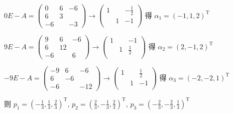 \begin{enumerate}
                   \( 0E-A = \begin{pmatrix}
                       0  & 6 & -6 \\
                       6  & 3 &    \\
                       -6 &   & -3
                   \end{pmatrix} \rightarrow \begin{pmatrix}
                       1 &   & -\frac{1}{2} \\
                         & 1 & -1           \\
                         &   &
                   \end{pmatrix} \) 得 \( \alpha_{1} = (-1, 1, 2)^{\mathrm{T}} \)

                   \( 9E-A = \begin{pmatrix}
                       9  & 6  & -6 \\
                       6  & 12 &    \\
                       -6 &    & 6
                   \end{pmatrix} \rightarrow \begin{pmatrix}
                       1 &   & -1          \\
                         & 1 & \frac{1}{2} \\
                         &   &
                   \end{pmatrix} \) 得 \( \alpha_{2} = (2, -1, 2)^{\mathrm{T}} \)

                   \( -9E-A = \begin{pmatrix}
                       -9 & 6  & -6  \\
                       6  & -6 &     \\
                       -6 &    & -12
                   \end{pmatrix} \rightarrow \begin{pmatrix}
                       1 &   & \frac{1}{2} \\
                         & 1 & -1          \\
                         &   &
                   \end{pmatrix} \) 得 \( \alpha_{3} = (-2, -2, 1)^{\mathrm{T}} \)

                   则 \( p_{1} = \left( -\frac{1}{3}, \frac{1}{3}, \frac{2}{3} \right)^{\mathrm{T}} \), \(p_{2} = \left( \frac{2}{3}, -\frac{1}{3}, \frac{2}{3} \right)^{\mathrm{T}} \), \( p_{3} = \left( -\frac{2}{3}, -\frac{2}{3}, \frac{1}{3} \right)^{\mathrm{T}} \)


\end{enumerate}
